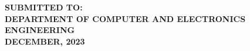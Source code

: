\documentclass[a4paper,12pt]{report}
\begin{document}
\begin{titlepage}
\begin{center}
{\large \uppercase{\textbf{submitted to:}}}\\[0.4cm]

{\large \uppercase{\textbf{Department of computer and electronics\\[0.5cm]engineering}}}\\[0.6cm]

{\large \uppercase{\textbf{december, 2023}}}

\end{center}
\end{titlepage}
\end{document}
